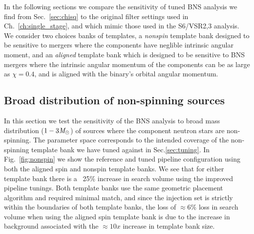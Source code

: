 In the following sections we compare the sensitivity of tuned BNS analysis we find from Sec.~\ref{sec:chisq} to the original filter settings used in Ch.~\ref{ch:single_stage}, and which mimic those used in the S6/VSR2,3 analysis. We consider two choices banks of templates, a \emph{nonspin} template bank designed to be sensitive to mergers where the components have neglible intrinsic angular moment, and an \emph{aligned} template bank which is designed to be sensitive to BNS mergers where the intrinsic angular momentum of the components can be as large as $\chi=0.4$, and is aligned with the binary's orbital angular momentum.

\subsection{Broad distribution of non-spinning sources}

In this section we test the sensitivity of the BNS analysis to broad mass distribution ($1-3 \mathit{M}_\odot$) of sources where the component neutron stars are non-spinning. The parameter space corresponds to the intended coverage of the non-spinning template bank we have tuned against in Sec.\ref{sec:tuning}.  In Fig.~\ref{fig:nonspin} we show the reference and tuned pipeline configuration using both the aligned spin and nonspin template banks. We see that for either template bank there is a ~25$\%$ increase in search volume using the improved pipeline tunings. Both template banks use the same geometric placement algorithm and required minimal match, and since the injection set is strictly within the boundaries of both template banks, the loss of $\approx 6\%$ loss in search volume when using the aligned spin template bank is due to the increase in background associated with the $\approx 10x$ increase in template bank size.

